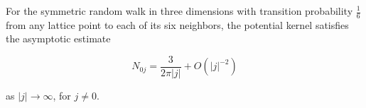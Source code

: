 For the symmetric random walk in three dimensions with transition probability $\frac{1}{6}$ from any lattice point to each of its six neighbors, the potential kernel satisfies the asymptotic estimate

$$N_{0j} = \frac{3}{2\pi|j|} + O(|j|^{-2})$$

as $|j| \to \infty$, for $j \neq 0$.
